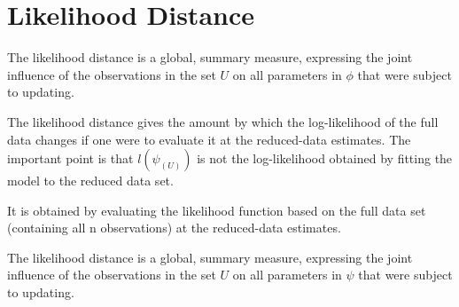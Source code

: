 \documentclass[12pt, a4paper]{report}
\theoremstyle{plain}
\theoremstyle{definition}
\theoremstyle{remark}
\begin{document}
\section{Likelihood Distance} %
The  likelihood distance is a global, summary measure, expressing the joint influence of the observations in the set $U$ on all parameters in $\phi$  that were subject to updating.

The likelihood distance gives the amount by which the log-likelihood of the full data changes if one were
to evaluate it at the reduced-data estimates. The important point is that $l(\psi_{(U)})$ is not the log-likelihood
obtained by fitting the model to the reduced data set.

It is obtained by evaluating the likelihood function based on the full data set (containing all n observations) at the reduced-data estimates.

The likelihood distance is a global, summary measure, expressing the joint influence of the observations in
the set $U$ on all parameters in $\psi$  that were subject to updating.








%
%
%
\end{document}
